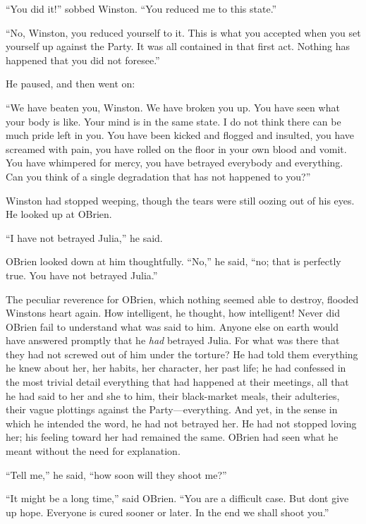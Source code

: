 ``You did it!'' sobbed Winston. ``You reduced me to this state.''

``No, Winston, you reduced yourself to it. This is what you accepted when
you set yourself up against the Party. It was all contained in that
first act. Nothing has happened that you did not foresee.''

He paused, and then went on:

``We have beaten you, Winston. We have broken you up. You have seen what
your body is like. Your mind is in the same state. I do not think there
can be much pride left in you. You have been kicked and flogged and
insulted, you have screamed with pain, you have rolled on the floor in
your own blood and vomit. You have whimpered for mercy, you have
betrayed everybody and everything. Can you think of a single degradation
that has not happened to you?''

Winston had stopped weeping, though the tears were still oozing out of
his eyes. He looked up at O\textquotesingle Brien.

``I have not betrayed Julia,'' he said.

O\textquotesingle Brien looked down at him thoughtfully. ``No,'' he said,
``no; that is perfectly true. You have not betrayed Julia.''

The peculiar reverence for O\textquotesingle Brien, which nothing seemed
able to destroy, flooded Winston\textquotesingle s heart again. How
intelligent, he thought, how intelligent! Never did
O\textquotesingle Brien fail to understand what was said to him. Anyone
else on earth would have answered promptly that he \emph{had} betrayed
Julia. For what was there that they had not screwed out of him under the
torture? He had told them everything he knew about her, her habits, her
character, her past life; he had confessed in the most trivial detail
everything that had happened at their meetings, all that he had said to
her and she to him, their black-market meals, their adulteries, their
vague plottings against the Party---everything. And yet, in the sense in
which he intended the word, he had not betrayed her. He had not stopped
loving her; his feeling toward her had remained the same.
O\textquotesingle Brien had seen what he meant without the need for
explanation.

``Tell me,'' he said, ``how soon will they shoot me?''

``It might be a long time,'' said O\textquotesingle Brien. ``You are a
difficult case. But don\textquotesingle t give up hope. Everyone is
cured sooner or later. In the end we shall shoot you.''


